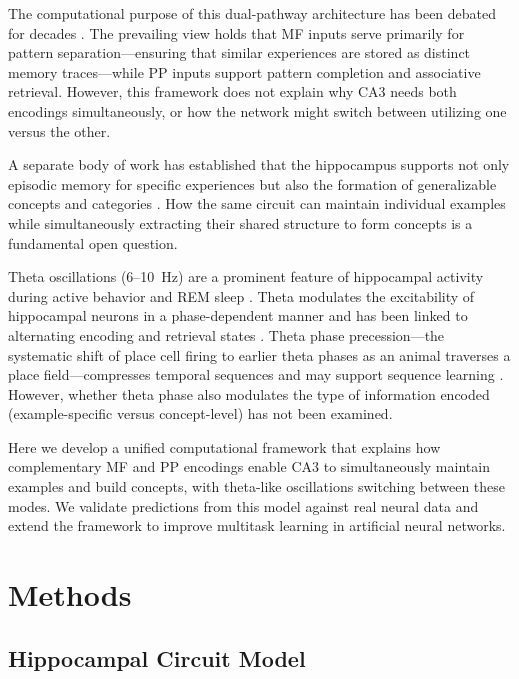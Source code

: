 \documentclass[11pt]{article}
\begin{document}
The computational purpose of this dual-pathway architecture has been debated for decades \citep{marr1971simple, treves1992computational}. The prevailing view holds that MF inputs serve primarily for pattern separation---ensuring that similar experiences are stored as distinct memory traces---while PP inputs support pattern completion and associative retrieval. However, this framework does not explain why CA3 needs both encodings simultaneously, or how the network might switch between utilizing one versus the other.

A separate body of work has established that the hippocampus supports not only episodic memory for specific experiences but also the formation of generalizable concepts and categories \citep{kumaran2012generalization}. How the same circuit can maintain individual examples while simultaneously extracting their shared structure to form concepts is a fundamental open question.

Theta oscillations (6--10~Hz) are a prominent feature of hippocampal activity during active behavior and REM sleep \citep{buzsaki2002theta}. Theta modulates the excitability of hippocampal neurons in a phase-dependent manner and has been linked to alternating encoding and retrieval states \citep{hasselmo2002proposed, colgin2009frequency}. Theta phase precession---the systematic shift of place cell firing to earlier theta phases as an animal traverses a place field---compresses temporal sequences and may support sequence learning \citep{skaggs1996theta}. However, whether theta phase also modulates the type of information encoded (example-specific versus concept-level) has not been examined.

Here we develop a unified computational framework that explains how complementary MF and PP encodings enable CA3 to simultaneously maintain examples and build concepts, with theta-like oscillations switching between these modes. We validate predictions from this model against real neural data and extend the framework to improve multitask learning in artificial neural networks.

\section{Methods}

\subsection{Hippocampal Circuit Model}
\end{document}
